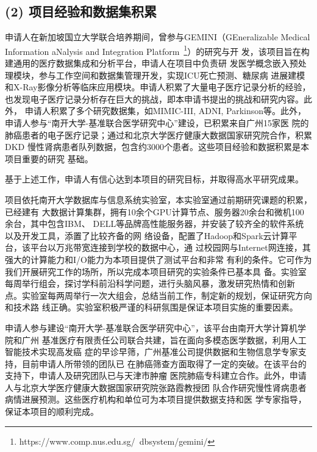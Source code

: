 \documentclass[a4paper,zihao=-4]{article}
\begin{document}
\subsection*{(2) 项目经验和数据集积累}

申请人在新加坡国立大学联合培养期间，曾参与GEMINI（GEneralizable Medical
Information aNalysis and Integration
Platform~\footnote{https://www.comp.nus.edu.sg/~dbsystem/gemini/}）的研究与开
发，该项目旨在构建通用的医疗数据集成和分析平台，{\kaishu 申请人在项目中负责研
发医学概念嵌入预处理模块，参与工作空间和数据集管理开发，实现ICU死亡预测、糖尿病
进展建模和X-Ray影像分析等临床应用模块}。申请人积累了大量电子医疗记录分析的经验，
也发现电子医疗记录分析存在巨大的挑战，即本申请书提出的挑战和研究内容。此外，
{\kaishu 申请人积累了多个研究数据集，如MIMIC-III, ADNI, Parkinson等}。此外，
{\kaishu 申请人参与“南开大学-基准联合医学研究中心”建设}，已积累来自广州15家医
院的肺癌患者的电子医疗记录；通过和北京大学医疗健康大数据国家研究院合作，积累DKD
慢性肾病患者队列数据，包含约3000个患者。这些项目经验和数据积累是本项目重要的研究
基础。

基于上述工作，申请人有信心达到本项目的研究目标，并取得高水平研究成果。


项目依托南开大学数据库与信息系统实验室，本实验室通过前期研究课题的积累，已经建有
大数据计算集群，拥有10余个GPU计算节点、服务器20余台和微机100余台，其中包含IBM、
DELL等品牌高性能服务器，并安装了较齐全的软件系统以及开发工具，添置了比较齐备的网
络设备，配置了Hadoop和Spark云计算平台，该平台以万兆带宽连接到学校的数据中心，通
过校园网与Internet网连接，其强大的计算能力和I/O能力为本项目提供了测试平台和非常
有利的条件。它可作为我们开展研究工作的场所，所以完成本项目研究的实验条件已基本具
备。实验室每周举行组会，探讨学科前沿科学问题，进行头脑风暴，激发研究热情和创新
点。实验室每两周举行一次大组会，总结当前工作，制定新的规划，保证研究方向和技术路
线正确。实验室积极严谨的科研氛围是保证本项目实施的重要因素。

申请人参与建设“南开大学-基准联合医学研究中心”，该平台由南开大学计算机学院和广州
基准医疗有限责任公司联合共建，旨在面向多模态医学数据，利用人工智能技术实现高发癌
症的早诊早筛，广州基准公司提供数据和生物信息学专家支持，目前申请人所带领的团队已
在肺癌筛查方面取得了一定的突破。在该平台的支持下，申请人及研究团队已与天津市肿瘤
医院肺癌专科建立合作。此外，申请人与北京大学医疗健康大数据国家研究院张路霞教授团
队合作研究慢性肾病患者病情进展预测。这些医疗机构和单位可为本项目提供数据支持和医
学专家指导，保证本项目的顺利完成。
\end{document}
